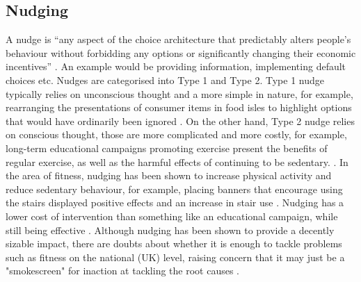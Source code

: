 \subsection{Nudging}
A nudge is “any aspect of the choice architecture that predictably alters people's behaviour without forbidding any options or significantly changing their economic incentives” \cite{nudgeDef}. An example would be providing information, implementing default choices etc. Nudges are categorised into Type 1 and Type 2. Type 1 nudge typically relies on unconscious thought and a more simple in nature, for example, rearranging the presentations of consumer items in food isles to highlight options that would have ordinarily been ignored \cite{NudgeCritical}. On the other hand, Type 2 nudge relies on conscious thought, those are more complicated and more costly, for example, long-term educational campaigns promoting exercise present the benefits of regular exercise, as well as the harmful effects of continuing to be sedentary. \cite{NudgeCritical}.  In the area of fitness, nudging has been shown to increase physical activity and reduce sedentary behaviour, for example, placing banners that encourage using the stairs displayed positive effects and an increase in stair use \cite{FORBERGER2022106922, Forberger2019}. Nudging has a lower cost of intervention than something like an educational campaign, while still being effective \cite{nudgeCost}. Although nudging has been shown to provide a decently sizable impact, there are doubts about whether it is enough to tackle problems such as fitness on the national (UK) level, raising concern that it may just be a "smokescreen" for inaction at tackling the root causes \cite{Raynerd2177}.

